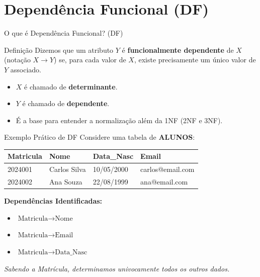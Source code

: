 \documentclass[9pt]{beamer}
\begin{document}
\section{Dependência Funcional (DF)}

\begin{frame}{O que é Dependência Funcional? (DF)}
  \begin{block}{Definição}
     Dizemos que um atributo $Y$ é \textbf{funcionalmente dependente} de $X$ (notação $X \to Y$) se, para cada valor de $X$, existe precisamente um único valor de $Y$ associado.
  \end{block}
  \vspace{0.4cm}
  \begin{itemize}
    \item $X$ é chamado de \textbf{determinante}.
    \item $Y$ é chamado de \textbf{dependente}.
    \item É a base para entender a normalização além da 1NF (2NF e 3NF).
  \end{itemize}
\end{frame}

\begin{frame}{Exemplo Prático de DF}
  Considere uma tabela de \textbf{ALUNOS}:
  \vspace{0.3cm}
  \centering
  \begin{small}
  \begin{tabular}{|l|l|l|l|}
    \hline
    \textbf{Matricula} & \textbf{Nome} & \textbf{Data\_Nasc} & \textbf{Email} \\ \hline
    2024001 & Carlos Silva & 10/05/2000 & carlos@email.com \\ \hline
    2024002 & Ana Souza & 22/08/1999 & ana@email.com \\ \hline
  \end{tabular}
  \end{small}
  \vspace{0.4cm}
  \textbf{Dependências Identificadas:}
  \begin{itemize}
    \item $\text{Matricula} \to \text{Nome}$
    \item $\text{Matricula} \to \text{Email}$
    \item $\text{Matricula} \to \text{Data\_Nasc}$
  \end{itemize}
  \textit{Sabendo a Matrícula, determinamos univocamente todos os outros dados.}
\end{frame}
\end{document}
